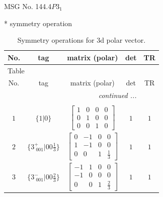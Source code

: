 \documentclass[fleqn,8pt]{jsarticle}
\begin{document}
\setcounter{MaxMatrixCols}{32}

\renewcommand{\tablename}{Table~}
\renewcommand{\figurename}{Figure~}
\begin{center}
\LARGE
MSG No. 144.4\quad$P3_{1}$
\end{center}
* symmetry operation
\renewcommand{\arraystretch}{1.3}
\begin{longtable}{ccccc}
\caption{Symmetry operations for 3d polar vector.}
 \\
 \hline \hline
No. & tag & matrix (polar) & det & TR \\ \hline \endfirsthead

\multicolumn{4}{l}{\tablename\ \thetable{}} \\
 \hline \hline
No. & tag & matrix (polar) & det & TR \\ \hline \endhead

 \hline \hline
\multicolumn{4}{r}{\footnotesize\it continued ...} \\ \endfoot

 \hline \hline
\multicolumn{4}{r}{} \\ \endlastfoot

$ 1 $ & $ \{1|0\} $ & $ \begin{bmatrix} 1 & 0 & 0 & 0 \\ 0 & 1 & 0 & 0 \\ 0 & 0 & 1 & 0 \end{bmatrix} $ & $ 1 $ & $ 1 $ \\ \hline
$ 2 $ & $ \{3^{+}_{\,\,001}|0 0 \frac{1}{3}\} $ & $ \begin{bmatrix} 0 & -1 & 0 & 0 \\ 1 & -1 & 0 & 0 \\ 0 & 0 & 1 & \frac{1}{3} \end{bmatrix} $ & $ 1 $ & $ 1 $ \\ \hline
$ 3 $ & $ \{3^{-}_{\,\,001}|0 0 \frac{2}{3}\} $ & $ \begin{bmatrix} -1 & 1 & 0 & 0 \\ -1 & 0 & 0 & 0 \\ 0 & 0 & 1 & \frac{2}{3} \end{bmatrix} $ & $ 1 $ & $ 1 $ \\
\end{longtable}
\end{document}
